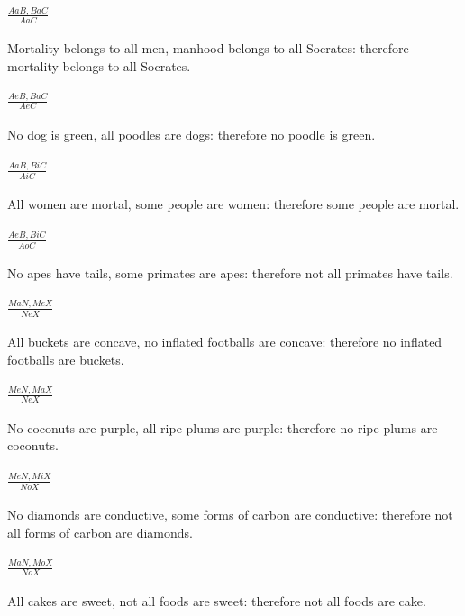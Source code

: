 \documentclass{article}
\begin{document}
\paragraph{$\frac{AaB,BaC}{AaC}$}
Mortality belongs to all men, manhood belongs to all Socrates:
therefore mortality belongs to all Socrates.

\paragraph{$\frac{AeB,BaC}{AeC}$}
No dog is green, all poodles are dogs: therefore no poodle is green.

\paragraph{$\frac{AaB,BiC}{AiC}$}
All women are mortal, some people are women: therefore some people are mortal.

\paragraph{$\frac{AeB,BiC}{AoC}$}
No apes have tails, some primates are apes:
therefore not all primates have tails.

\paragraph{$\frac{MaN,MeX}{NeX}$}
All buckets are concave, no inflated footballs are concave:
therefore no inflated footballs are buckets.

\paragraph{$\frac{MeN,MaX}{NeX}$}
No coconuts are purple, all ripe plums are purple:
therefore no ripe plums are coconuts.

\paragraph{$\frac{MeN,MiX}{NoX}$}
No diamonds are conductive, some forms of carbon are conductive:
therefore not all forms of carbon are diamonds.

\paragraph{$\frac{MaN,MoX}{NoX}$}
All cakes are sweet, not all foods are sweet:
therefore not all foods are cake.
\end{document}
